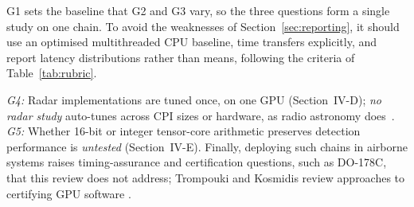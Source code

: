 G1 sets the baseline that G2 and G3 vary,
so the three questions form a single study on one chain.
To avoid the weaknesses of Section~\ref{sec:reporting},
it should use an optimised multithreaded CPU baseline, time transfers explicitly,
and report latency distributions rather than means, following the criteria of Table~\ref{tab:rubric}.

\textit{G4:} Radar implementations are tuned once, on one GPU (Section~IV-D); \emph{no radar study} auto-tunes across CPI sizes or hardware, as radio astronomy does~\cite{scloccoRealtimeDedispersionFast2016a}. \textit{G5:} Whether 16-bit or integer tensor-core arithmetic preserves detection performance is \emph{untested} (Section~IV-E).
Finally, deploying such chains in airborne systems raises timing-assurance and certification questions, such as DO-178C,
that this review does not address;
Trompouki and Kosmidis review approaches to certifying GPU software \cite{mariatrompoukiDO178CCertificationGeneralPurpose2021a}.

